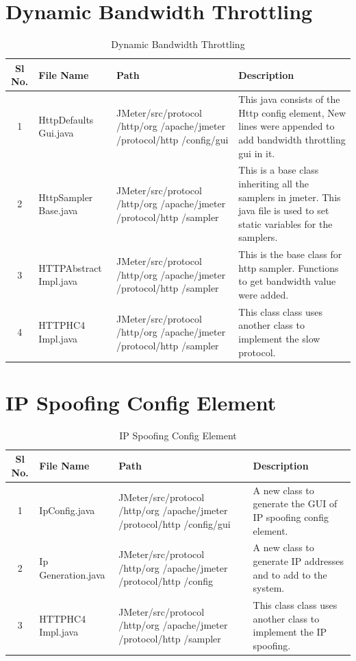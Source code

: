 \documentclass[12pt]{book}
\begin{document}
 \section{Dynamic Bandwidth Throttling}
  \begin{table}[H]
  \begin{center}
   \begin{tabular}{|c|p{3cm}|p{5cm}|p{6cm}|} 
   \hline
   \textbf{Sl No.} & \textbf{File Name} & \textbf{Path} & \textbf{Description}\\
   \hline
   1 & HttpDefaults Gui.java & JMeter/src/protocol /http/org /apache/jmeter /protocol/http /config/gui & This java consists of the Http config element, New lines were appended to add bandwidth throttling gui in  it.\\
   \hline
   2 & HttpSampler Base.java &  JMeter/src/protocol /http/org /apache/jmeter /protocol/http /sampler & This is a base class inheriting all the samplers in jmeter. This java file is used to set static variables for the samplers.\\
   \hline
   3 & HTTPAbstract Impl.java &  JMeter/src/protocol /http/org /apache/jmeter /protocol/http /sampler & This is the base class for http sampler. Functions to get bandwidth value were added.\\
   \hline
   4 & HTTPHC4 Impl.java &  JMeter/src/protocol /http/org /apache/jmeter /protocol/http /sampler & This class class uses another class to implement the slow protocol.\\
   \hline
   \end{tabular}
   \caption{Dynamic Bandwidth Throttling}
  \end{center}
 \end{table}
 
  \section{IP Spoofing Config Element}
  \begin{table}[H]
  \begin{center}
   \begin{tabular}{|c|p{3cm}|p{5cm}|p{6cm}|} 
   \hline
   \textbf{Sl No.} & \textbf{File Name} & \textbf{Path} & \textbf{Description}\\
   \hline
   1 & IpConfig.java & JMeter/src/protocol /http/org /apache/jmeter /protocol/http /config/gui & A new class to generate the GUI of IP spoofing config element.\\
   \hline
   2 & Ip Generation.java & JMeter/src/protocol /http/org /apache/jmeter /protocol/http /config & A new class to generate IP addresses and to add to the system.\\
   \hline
   3 & HTTPHC4 Impl.java & JMeter/src/protocol /http/org /apache/jmeter /protocol/http /sampler & This class class uses another class to implement the IP spoofing.\\
   
   \hline
   \end{tabular}
   \caption{IP Spoofing Config Element}
  \end{center}
 \end{table}
\end{document}
